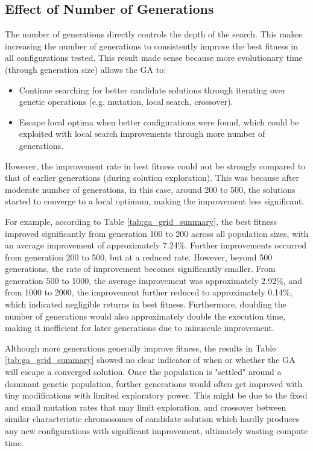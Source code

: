 \documentclass{article}
\begin{document}
\subsection{Effect of Number of Generations}
The number of generations directly controls the depth of the search. This makes increasing the number of generations to consistently improve the best fitness in all configurations tested. This result made sense because more evolutionary time (through generation size) allows the GA to:
\begin{itemize}
    \item Continue searching for better candidate solutions through iterating over genetic operations (e.g. mutation, local search, crossover).
    \item Escape local optima when better configurations were found, which could be exploited with local search improvements through more number of generations.
\end{itemize}
However, the improvement rate in best fitness could not be strongly compared to that of earlier generations (during solution exploration). This was because after moderate number of generations, in this case, around 200 to 500, the solutions started to converge to a local optimum, making the improvement less significant. 

For example, according to Table \ref{tab:ga_grid_summary}, the best fitness improved significantly from generation 100 to 200 across all population sizes, with an average improvement of approximately 7.24\%. Further improvements occurred from generation 200 to 500, but at a reduced rate. However, beyond 500 generations, the rate of improvement becomes significantly smaller. From generation 500 to 1000, the average improvement was approximately 2.92\%, and from 1000 to 2000, the improvement further reduced to approximately 0.14\%, which indicated negligible returns in best fitness. Furthermore, doubling the number of generations would also approximately double the execution time, making it inefficient for later generations due to minuscule improvement.

Although more generations generally improve fitness, the results in Table \ref{tab:ga_grid_summary} showed no clear indicator of when or whether the GA will escape a converged solution. Once the population is "settled" around a dominant genetic population, further generations would often get improved with tiny modifications with limited exploratory power. This might be due to the fixed and small mutation rates that may limit exploration, and crossover between similar characteristic chromosomes of candidate solution which hardly produces any new configurations with significant improvement, ultimately wasting compute time.
\end{document}
